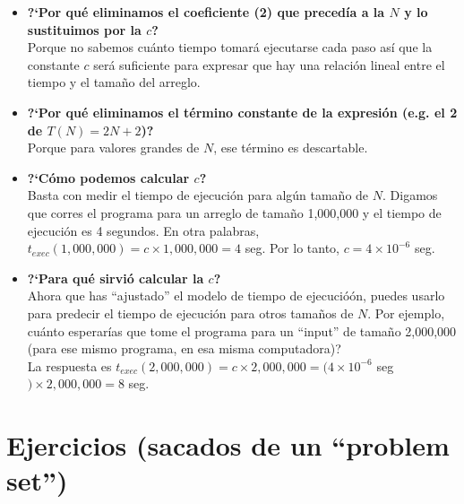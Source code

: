 \documentclass[11 pt]{article}
\begin{document}
\begin{itemize}
    \item \textbf{?`Por qu\'e eliminamos el coeficiente (2) que preced\'ia a la $N$ y lo sustituimos por la $c$?} \\

    Porque no sabemos cu\'anto tiempo tomar\'a ejecutarse cada paso as\'i que la constante $c$ ser\'a suficiente para expresar que hay una relaci\'on lineal entre el tiempo y el tama\~no del arreglo. 

    \item \textbf{?`Por qu\'e eliminamos el t\'ermino constante de la expresi\'on (e.g. el 2 de $T(N) = 2N + 2$)?} \\
    
    Porque para valores grandes de $N$, ese t\'ermino es descartable.  

    \item \textbf{?`C\'omo podemos calcular $c$?} \\

    Basta con medir el tiempo de ejecuci\'on para alg\'un tamaño de $N$. Digamos que corres el programa para un arreglo de tama\~no 1,000,000 y el tiempo de ejecuci\'on es 4 segundos. En otra palabras, $t_{exec}(1,000,000) = c \times 1,000,000 = 4$ seg. Por lo tanto, $c = 4 \times 10^{-6}$ seg.
    
    \item \textbf{?`Para qu\'e sirvi\'o calcular la $c$?} \\

    Ahora que has ``ajustado'' el modelo de tiempo de ejecució\'on, puedes usarlo para predecir el tiempo de ejecuci\'on para otros tama\~nos de $N$. Por ejemplo, cu\'anto esperar\'ias que tome el programa para un ``input'' de tama\~no 2,000,000 (para ese mismo programa, en esa misma computadora)? \\
    La respuesta es $t_{exec}(2,000,000) = c \times 2,000,000 = (4 \times 10^{-6}$ seg $) \times 2,000,000 = 8$ seg.

    
\end{itemize}

\newpage

\section{Ejercicios (sacados de un ``problem set'')}
\end{document}
